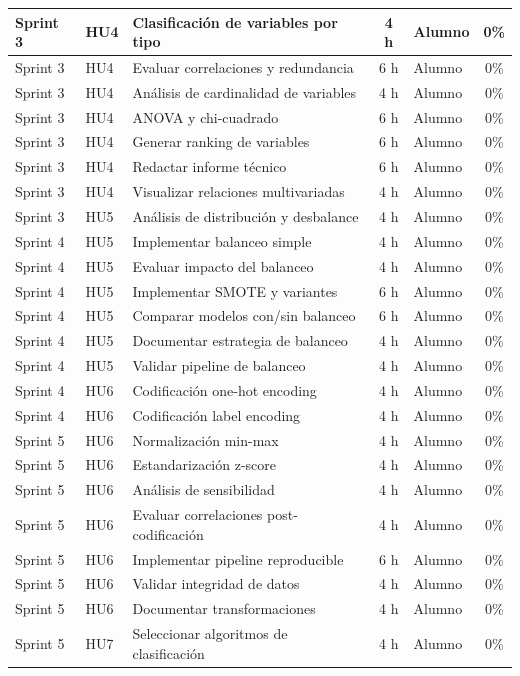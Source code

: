 \documentclass[
11pt, %
]{charter}
\begin{document}
\begin{table}[htpb]
\begin{tabularx}{\linewidth}{@{}|l|l|X|c|l|c|@{}}
Sprint 3 & HU4 & Clasificación de variables por tipo & 4 h & Alumno & 0\% \\ \hline
Sprint 3 & HU4 & Evaluar correlaciones y redundancia & 6 h & Alumno & 0\% \\ \hline
Sprint 3 & HU4 & Análisis de cardinalidad de variables & 4 h & Alumno & 0\% \\ \hline
Sprint 3 & HU4 & ANOVA y chi-cuadrado & 6 h & Alumno & 0\% \\ \hline
Sprint 3 & HU4 & Generar ranking de variables & 6 h & Alumno & 0\% \\ \hline
Sprint 3 & HU4 & Redactar informe técnico & 6 h & Alumno & 0\% \\ \hline
Sprint 3 & HU4 & Visualizar relaciones multivariadas & 4 h & Alumno & 0\% \\ \hline
Sprint 3 & HU5 & Análisis de distribución y desbalance & 4 h & Alumno & 0\% \\ \hline

Sprint 4 & HU5 & Implementar balanceo simple & 4 h & Alumno & 0\% \\ \hline
Sprint 4 & HU5 & Evaluar impacto del balanceo & 4 h & Alumno & 0\% \\ \hline
Sprint 4 & HU5 & Implementar SMOTE y variantes & 6 h & Alumno & 0\% \\ \hline
Sprint 4 & HU5 & Comparar modelos con/sin balanceo & 6 h & Alumno & 0\% \\ \hline
Sprint 4 & HU5 & Documentar estrategia de balanceo & 4 h & Alumno & 0\% \\ \hline
Sprint 4 & HU5 & Validar pipeline de balanceo & 4 h & Alumno & 0\% \\ \hline
Sprint 4 & HU6 & Codificación one-hot encoding & 4 h & Alumno & 0\% \\ \hline
Sprint 4 & HU6 & Codificación label encoding & 4 h & Alumno & 0\% \\ \hline

Sprint 5 & HU6 & Normalización min-max & 4 h & Alumno & 0\% \\ \hline
Sprint 5 & HU6 & Estandarización z-score & 4 h & Alumno & 0\% \\ \hline
Sprint 5 & HU6 & Análisis de sensibilidad & 4 h & Alumno & 0\% \\ \hline
Sprint 5 & HU6 & Evaluar correlaciones post-codificación & 4 h & Alumno & 0\% \\ \hline
Sprint 5 & HU6 & Implementar pipeline reproducible & 6 h & Alumno & 0\% \\ \hline
Sprint 5 & HU6 & Validar integridad de datos & 4 h & Alumno & 0\% \\ \hline
Sprint 5 & HU6 & Documentar transformaciones & 4 h & Alumno & 0\% \\ \hline
Sprint 5 & HU7 & Seleccionar algoritmos de clasificación & 4 h & Alumno & 0\% \\ \hline


\end{tabularx}
\end{table}
\end{document}
